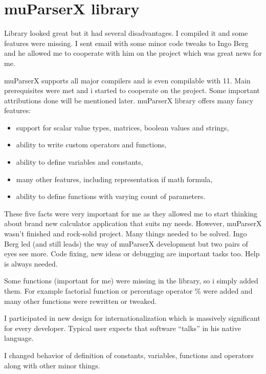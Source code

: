 \chapter{muParserX library}
Library looked great but it had several disadvantages. I compiled it and some features were missing. I sent email with some minor code tweaks to Ingo Berg and he allowed me to cooperate with him on the project which was great news for me.

muParserX supports all major compilers and is even compilable with \cpp{} 11. Main prerequisites were met and i started to cooperate on the project. Some important attributions done will be mentioned later. muParserX library offers many fancy features:
\begin{itemize}
\item support for scalar value types, matrices, boolean values and strings,
\item ability to write custom operators and functions,
\item ability to define variables and constants,
\item many other features, including  representation if math formula,
\item ability to define functions with varying count of parameters.
\end{itemize}

These five facts were very important for me as they allowed me to start thinking about brand new calculator application that suits my needs. However, muParserX wasn't finished and rock-solid project. Many things needed to be solved. Ingo Berg led (and still leads) the way of muParserX development but two pairs of eyes see more. Code fixing, new ideas or debugging are important tasks too. Help is always needed.

Some functions (important for me) were missing in the library, so i simply added them. For example factorial function or percentage operator \% were added	and many other functions were rewritten or tweaked.

I participated in new design for internationalization which is massively significant for every developer. Typical user expects that software \enquote{talks} in his native language.

I changed behavior of definition of constants, variables, functions and operators along with other minor things.


